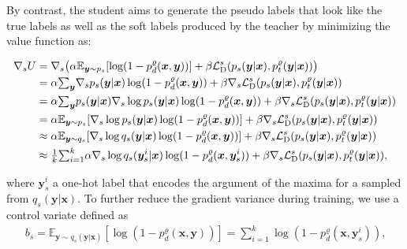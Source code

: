 \documentclass{article}
\newcommand{\OVEC}[1]{\bm{#1}} %
\newcommand{\SVEC}[1]{\bm{#1}} %
\newcommand{\LOSS}[2]{\mathcal{#1}_{\rm{#2}}} %
\newcommand{\EXP}{\mathbb{E}} %
\newcommand{\kdganabbrobj}{U}
\newcommand{\stddistloss}{\LOSS{L}{D}^{s}}
\newcommand{\abbrpstd}{p_{s}}
\newcommand{\abbrqstd}{q_{s}}
\newcommand{\fullpstd}[1]{p_{s}(#1|\OVEC{x})}
\newcommand{\fullqstd}[1]{q_{s}(#1|\OVEC{x})}
\newcommand{\fullptch}[1]{p_{t}^{\varrho}(#1|\OVEC{x})}
\newcommand{\fullpdis}[1]{p_{d}^{\varrho}(\OVEC{x},#1)}
\begin{document}
By contrast, the student aims to generate the pseudo labels that look like the true labels as well as the soft labels produced by the teacher by minimizing the value function as:
\begin{small}
\begin{equation*}
\begin{aligned}
\nabla_{s}
\kdganabbrobj
&=
\nabla_{s}
\big(
\alpha\EXP_{\OVEC{y}\sim\abbrpstd}[\log(1-\fullpdis{\OVEC{y}})]
+
\beta\stddistloss(\fullpstd{\OVEC{y}},\fullptch{\OVEC{y}})
\big)
\\
&=
\alpha{\textstyle\sum}_{\OVEC{y}}
\nabla_{s}\fullpstd{\OVEC{y}}\log(1-\fullpdis{\OVEC{y}})
+
\beta\nabla_{s}\stddistloss(\fullpstd{\OVEC{y}},\fullptch{\OVEC{y}})
\\
&=
\alpha{\textstyle\sum}_{\OVEC{y}}
\fullpstd{\OVEC{y}}\nabla_{s}\log\fullpstd{\OVEC{y}}\log(1-\fullpdis{\OVEC{y}})
+
\beta\nabla_{s}\stddistloss(\fullpstd{\OVEC{y}},\fullptch{\OVEC{y}})
\\
&=
\alpha\EXP_{\OVEC{y}\sim\abbrpstd}
[\nabla_{s}\log\fullpstd{\OVEC{y}}\log(1-\fullpdis{\OVEC{y}})]
+
\beta\nabla_{s}\stddistloss(\fullpstd{\OVEC{y}},\fullptch{\OVEC{y}})
\\
&\approx
\alpha\EXP_{\OVEC{y}\sim\abbrqstd}
[\nabla_{s}\log\fullqstd{\OVEC{y}}\log(1-\fullpdis{\OVEC{y}})]
+
\beta\nabla_{s}\stddistloss(\fullpstd{\OVEC{y}},\fullptch{\OVEC{y}})
\\
&\approx
{\textstyle\frac{1}{k}}
{\textstyle\sum}_{i=1}^{k}
\alpha
\nabla_{s}\log\fullqstd{\OVEC{y}^{i}_{s}}
\log(1-\fullpdis{\SVEC{y}^{i}_{s}})
+
\beta
\nabla_{s}
\stddistloss(\fullpstd{\OVEC{y}},\fullptch{\OVEC{y}})
\text{,}
\\
\end{aligned}
\end{equation*}
\end{small}%
where $\SVEC{y}^{i}_{s}$ a one-hot label that encodes the argument of the maxima for a sampled from $\fullqstd{\OVEC{y}}$.
To further reduce the gradient variance during training, we use a control variate defined as \cite{wang2017irgan}
\begin{equation} \label{equ:baseline function}
\begin{aligned}
b_{s}
=
\EXP_{\OVEC{y}\sim\fullqstd{\OVEC{y}}}
[\log(1-\fullpdis{\OVEC{y}})]
=
{\textstyle\sum}_{i=1}^{k}\log(1-\fullpdis{\SVEC{y}^{i}_{s}})
\text{,}
\end{aligned}
\end{equation}%
\end{document}
